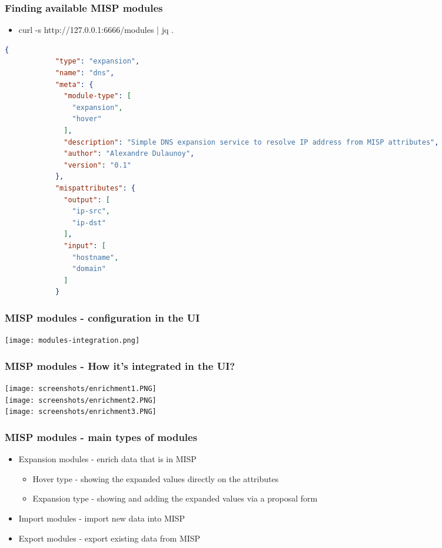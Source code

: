 \begin{frame}[fragile]
        \frametitle{Finding available MISP modules}
        \begin{itemize}
                \item curl -s http://127.0.0.1:6666/modules | jq .
        \end{itemize}
        \begin{adjustbox}{width=\textwidth,height=6cm,keepaspectratio}
        \begin{lstlisting}[language=json,firstnumber=1]
            {
            "type": "expansion",
            "name": "dns",
            "meta": {
              "module-type": [
                "expansion",
                "hover"
              ],
              "description": "Simple DNS expansion service to resolve IP address from MISP attributes",
              "author": "Alexandre Dulaunoy",
              "version": "0.1"
            },
            "mispattributes": {
              "output": [
                "ip-src",
                "ip-dst"
              ],
              "input": [
                "hostname",
                "domain"
              ]
            }
        \end{lstlisting}
        \end{adjustbox}
\end{frame}

\begin{frame}
        \frametitle{MISP modules - configuration in the UI}
        \texttt{[image: modules-integration.png]}
\end{frame}

\begin{frame}
        \frametitle{MISP modules - How it's integrated in the UI?}
        \texttt{[image: screenshots/enrichment1.PNG]}\\
        \texttt{[image: screenshots/enrichment2.PNG]}\\
        \texttt{[image: screenshots/enrichment3.PNG]}
\end{frame}

\begin{frame}
        \frametitle{MISP modules - main types of modules}
        \begin{itemize}
            \item Expansion modules - enrich data that is in MISP
                    \begin{itemize}
                        \item Hover type - showing the expanded values directly on the attributes
                        \item Expansion type - showing and adding the expanded values via a proposal form
                    \end{itemize}
            \item Import modules - import new data into MISP
            \item Export modules - export existing data from MISP
        \end{itemize}
\end{frame}

